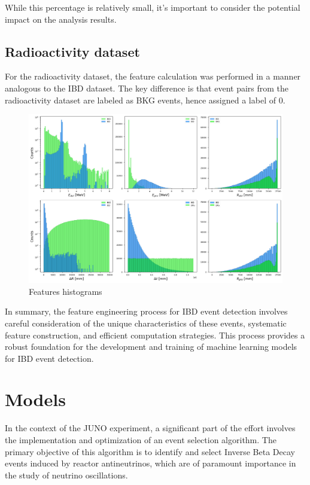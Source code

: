 While this percentage is relatively small, it's important to consider the potential impact on the analysis results.

\subsection{Radioactivity dataset}
For the radioactivity dataset, the feature calculation was performed in a manner analogous to the IBD dataset. The key difference is that event pairs from the radioactivity dataset are labeled as BKG events, hence assigned a label of 0.


\begin{figure}[h]
	\centering
	\includegraphics[width=1\linewidth]{Images/hist_features.png}
	\caption{Features histograms}
	\label{fig:hist_features}
\end{figure}



In summary, the feature engineering process for IBD event detection involves careful consideration of the unique characteristics of these events, systematic feature construction, and efficient computation strategies. This process provides a robust foundation for the development and training of machine learning models for IBD event detection.

\section{Models}
In the context of the JUNO experiment, a significant part of the effort involves the implementation and optimization of an event selection algorithm. The primary objective of this algorithm is to identify and select Inverse Beta Decay events induced by reactor antineutrinos, which are of paramount importance in the study of neutrino oscillations.

